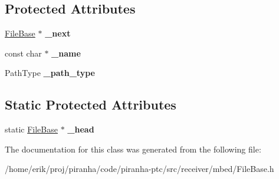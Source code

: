 \subsection*{Protected Attributes}
\begin{DoxyCompactItemize}
\item 
\hyperlink{classmbed_1_1FileBase}{File\+Base} $\ast$ {\bfseries \+\_\+next}\hypertarget{classmbed_1_1FileBase_acef47c84dc296ce35d5d2aa3695062af}{}\label{classmbed_1_1FileBase_acef47c84dc296ce35d5d2aa3695062af}

\item 
const char $\ast$ {\bfseries \+\_\+name}\hypertarget{classmbed_1_1FileBase_a9f22fa8bd5986c32dcf8e0a19f95e3b5}{}\label{classmbed_1_1FileBase_a9f22fa8bd5986c32dcf8e0a19f95e3b5}

\item 
Path\+Type {\bfseries \+\_\+path\+\_\+type}\hypertarget{classmbed_1_1FileBase_ae4a065275d45e77c512ec2d7c10f5d7b}{}\label{classmbed_1_1FileBase_ae4a065275d45e77c512ec2d7c10f5d7b}

\end{DoxyCompactItemize}
\subsection*{Static Protected Attributes}
\begin{DoxyCompactItemize}
\item 
static \hyperlink{classmbed_1_1FileBase}{File\+Base} $\ast$ {\bfseries \+\_\+head}\hypertarget{classmbed_1_1FileBase_ae9af3d7b863ca499d4e4a779632094f5}{}\label{classmbed_1_1FileBase_ae9af3d7b863ca499d4e4a779632094f5}

\end{DoxyCompactItemize}


The documentation for this class was generated from the following file\+:\begin{DoxyCompactItemize}
\item 
/home/erik/proj/piranha/code/piranha-\/ptc/src/receiver/mbed/File\+Base.\+h\end{DoxyCompactItemize}
